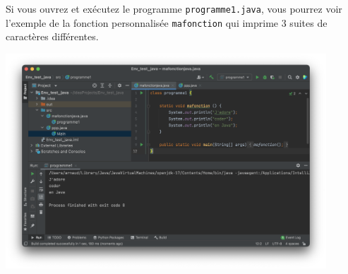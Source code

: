 Si vous ouvrez et exécutez le programme \lstinline{programme1.java}, vous pourrez voir l'exemple de la fonction personnalisée \lstinline{mafonction} qui imprime 3 suites de caractères différentes.

\begin{center}
\includegraphics[width=12cm]{fonction}		
\end{center}


